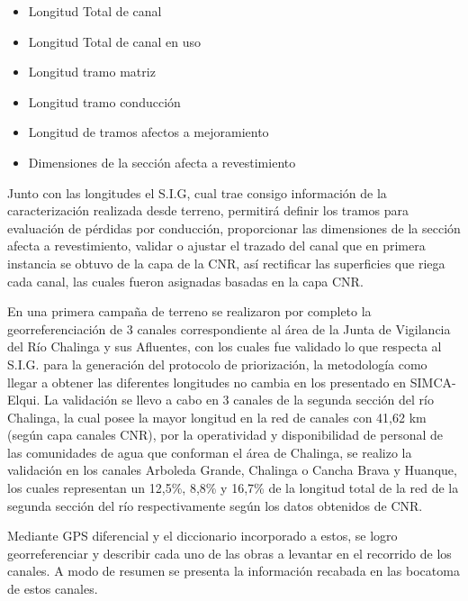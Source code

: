 \documentclass[]{article}
\begin{document}
 \begin{itemize}
 \item  Longitud Total de canal
 \item  Longitud Total de canal en uso
 \item Longitud tramo matriz
 \item Longitud tramo conducción
 \item Longitud de tramos afectos a mejoramiento
 \item Dimensiones de la sección afecta a revestimiento
 
 \end{itemize}

Junto con las longitudes el S.I.G, cual trae consigo información de la caracterización realizada desde terreno, permitirá definir los tramos para evaluación de pérdidas por conducción, proporcionar las dimensiones de la sección afecta a revestimiento, validar o ajustar el trazado del canal que en primera instancia se obtuvo de la capa de la CNR, así rectificar las superficies que riega cada canal, las cuales fueron asignadas basadas en la capa CNR. 

En una primera campaña de terreno se realizaron por completo la georreferenciación de 3 canales correspondiente al área de la Junta de Vigilancia del Río Chalinga y sus Afluentes, con los cuales fue validado lo que respecta al S.I.G. para la generación del protocolo de priorización, la metodología como llegar a obtener las diferentes longitudes no cambia en los presentado en SIMCA-Elqui. La validación se llevo a cabo en 3 canales de la segunda sección del río Chalinga, la cual posee la mayor longitud en la red de canales con 41,62 km (según capa canales CNR), por la operatividad y disponibilidad de personal de las comunidades de agua que conforman el área de Chalinga, se realizo la validación en los canales Arboleda Grande, Chalinga o Cancha Brava y Huanque, los cuales representan un 12,5\%, 8,8\% y 16,7\% de la longitud total de la red de la segunda sección del río respectivamente según los datos obtenidos de CNR.

Mediante GPS diferencial y el diccionario incorporado a estos, se logro georreferenciar y describir cada uno de las obras a levantar en el recorrido de los canales. A modo de resumen se presenta la información recabada en las bocatoma de estos canales.
\end{document}
